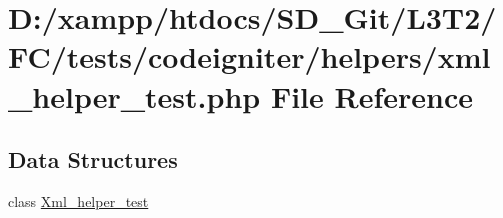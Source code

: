 \hypertarget{xml__helper__test_8php}{}\section{D\+:/xampp/htdocs/\+S\+D\+\_\+\+Git/\+L3\+T2/\+F\+C/tests/codeigniter/helpers/xml\+\_\+helper\+\_\+test.php File Reference}
\label{xml__helper__test_8php}
\subsection*{Data Structures}
\begin{DoxyCompactItemize}
\item 
class \hyperlink{class_xml__helper__test}{Xml\+\_\+helper\+\_\+test}
\end{DoxyCompactItemize}
